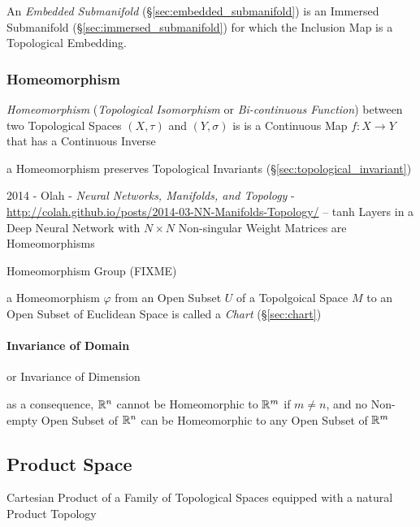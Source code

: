 An \emph{Embedded Submanifold} (\S\ref{sec:embedded_submanifold}) is an
Immersed Submanifold (\S\ref{sec:immersed_submanifold}) for which the Inclusion
Map is a Topological Embedding.



\subsubsection{Homeomorphism}\label{sec:homeomorphism}

\emph{Homeomorphism} (\emph{Topological Isomorphism} or \emph{Bi-continuous
  Function}) between two Topological Spaces $(X, \tau)$ and $(Y, \sigma)$ is is
a Continuous Map $f : X \rightarrow Y$ that has a Continuous Inverse

a Homeomorphism preserves Topological Invariants
(\S\ref{sec:topological_invariant})

2014 - Olah - \emph{Neural Networks, Manifolds, and Topology} -
\url{http://colah.github.io/posts/2014-03-NN-Manifolds-Topology/} -- tanh Layers
in a Deep Neural Network with $N \times N$ Non-singular Weight Matrices are
Homeomorphisms

Homeomorphism Group (FIXME)

a Homeomorphism $\varphi$ from an Open Subset $U$ of a Topolgoical Space $M$ to
an Open Subset of Euclidean Space is called a \emph{Chart} (\S\ref{sec:chart})



\paragraph{Invariance of Domain}\label{sec:domain_invariance}\hfill

or Invariance of Dimension

as a consequence, $\mathbb{R}^n$ cannot be Homeomorphic to $\mathbb{R}^m$ if $m \neq n$,
and no Non-empty Open Subset of $\mathbb{R}^n$ can be Homeomorphic to any Open
Subset of $\mathbb{R}^m$



\subsection{Product Space}\label{sec:product_space}

Cartesian Product of a Family of Topological Spaces equipped with a natural
Product Topology

